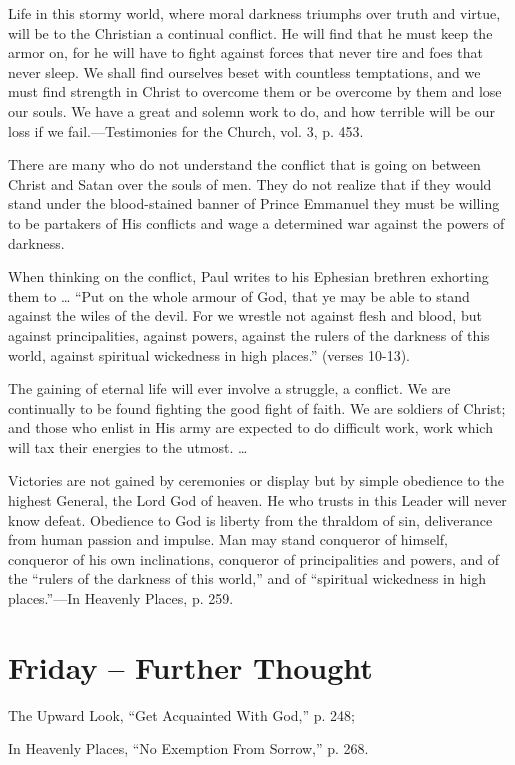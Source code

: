 \documentclass[a4paper, 10pt, twoside, headings=small]{scrartcl}
\begin{document}
\begin{multicols}{2}
Life in this stormy world, where moral darkness triumphs over truth and virtue, will be to the Christian a continual conflict. He will find that he must keep the armor on, for he will have to fight against forces that never tire and foes that never sleep. We shall find ourselves beset with countless temptations, and we must find strength in Christ to overcome them or be overcome by them and lose our souls. We have a great and solemn work to do, and how terrible will be our loss if we fail.—Testimonies for the Church, vol. 3, p. 453.

There are many who do not understand the conflict that is going on between Christ and Satan over the souls of men. They do not realize that if they would stand under the blood-stained banner of Prince Emmanuel they must be willing to be partakers of His conflicts and wage a determined war against the powers of darkness.

When thinking on the conflict, Paul writes to his Ephesian brethren exhorting them to … “Put on the whole armour of God, that ye may be able to stand against the wiles of the devil. For we wrestle not against flesh and blood, but against principalities, against powers, against the rulers of the darkness of this world, against spiritual wickedness in high places.” (verses 10-13).

The gaining of eternal life will ever involve a struggle, a conflict. We are continually to be found fighting the good fight of faith. We are soldiers of Christ; and those who enlist in His army are expected to do difficult work, work which will tax their energies to the utmost. …

Victories are not gained by ceremonies or display but by simple obedience to the highest General, the Lord God of heaven. He who trusts in this Leader will never know defeat. Obedience to God is liberty from the thraldom of sin, deliverance from human passion and impulse. Man may stand conqueror of himself, conqueror of his own inclinations, conqueror of principalities and powers, and of the “rulers of the darkness of this world,” and of “spiritual wickedness in high places.”—In Heavenly Places, p. 259.

\section*{Friday – Further Thought}

\setlength{\parindent}{0pt}The Upward Look, “Get Acquainted With God,” p. 248;

In Heavenly Places, “No Exemption From Sorrow,” p. 268.

\end{multicols}
\end{document}

